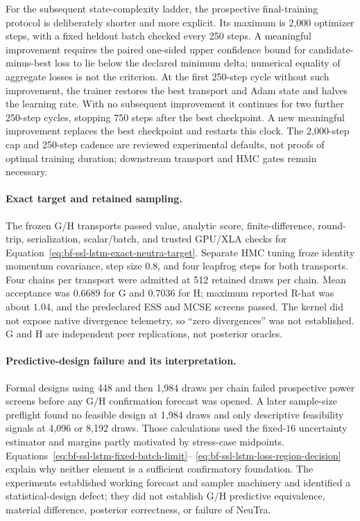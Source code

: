 For the subsequent state-complexity ladder, the prospective final-training
protocol is deliberately shorter and more explicit.  Its maximum is 2,000
optimizer steps, with a fixed heldout batch checked every 250 steps.  A
meaningful improvement requires the paired one-sided upper confidence bound for
candidate-minus-best loss to lie below the declared minimum delta; numerical
equality of aggregate losses is not the criterion.  At the first 250-step
cycle without such improvement, the trainer restores the best transport and
Adam state and halves the learning rate.  With no subsequent improvement it
continues for two further 250-step cycles, stopping 750 steps after the best
checkpoint.  A new meaningful improvement replaces the best checkpoint and
restarts this clock.  The 2,000-step cap and 250-step cadence are reviewed
experimental defaults, not proofs of optimal training duration; downstream
transport and HMC gates remain necessary.

\paragraph{Exact target and retained sampling.}
The frozen G/H transports passed value, analytic score, finite-difference,
round-trip, serialization, scalar/batch, and trusted GPU/XLA checks for
Equation~\eqref{eq:bf-ssl-lstm-exact-neutra-target}.  Separate HMC tuning froze
identity momentum covariance, step size $0.8$, and four leapfrog steps for both
transports.  Four chains per transport were admitted at 512 retained draws per
chain.  Mean acceptance was $0.6689$ for G and $0.7036$ for H; maximum reported
R-hat was about $1.04$, and the predeclared ESS and MCSE screens passed.  The
kernel did not expose native divergence telemetry, so ``zero divergences'' was
not established.  G and H are independent peer replications, not posterior
oracles.

\paragraph{Predictive-design failure and its interpretation.}
Formal designs using 448 and then 1,984 draws per chain failed prospective
power screens before any G/H confirmation forecast was opened.  A later
sample-size preflight found no feasible design at 1,984 draws and only
descriptive feasibility signals at 4,096 or 8,192 draws.  Those calculations
used the fixed-$16$ uncertainty estimator and margins partly motivated by
stress-case midpoints.  Equations~\eqref{eq:bf-ssl-lstm-fixed-batch-limit}--
\eqref{eq:bf-ssl-lstm-loss-region-decision} explain why neither element is a
sufficient confirmatory foundation.  The experiments established working
forecast and sampler machinery and identified a statistical-design defect;
they did not establish G/H predictive equivalence, material difference,
posterior correctness, or failure of NeuTra.

